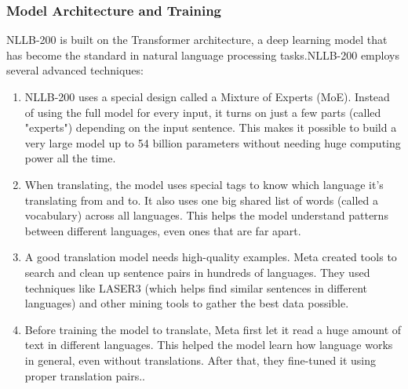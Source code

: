 \documentclass[12pt,oneside,openright,a4paper]{cpe-english-project}
\begin{document}
\subsubsection{Model Architecture and Training}

NLLB-200 is built on the Transformer architecture, a deep learning model that has become the standard in natural language processing tasks.NLLB-200 employs several advanced techniques:

\begin{enumerate}
	\item NLLB-200 uses a special design called a Mixture of Experts (MoE). Instead of using the full model for every input, it turns on just a few parts (called "experts") depending on the input sentence. This makes it possible to build a very large model up to 54 billion parameters without needing huge computing power all the time.
	\item When translating, the model uses special tags to know which language it’s translating from and to. It also uses one big shared list of words (called a vocabulary) across all languages. This helps the model understand patterns between different languages, even ones that are far apart.
	
	\item A good translation model needs high-quality examples. Meta created tools to search and clean up sentence pairs in hundreds of languages. They used techniques like LASER3 (which helps find similar sentences in different languages) and other mining tools to gather the best data possible.
	\item Before training the model to translate, Meta first let it read a huge amount of text in different languages. This helped the model learn how language works in general, even without translations. After that, they fine-tuned it using proper translation pairs..
\end{enumerate}

\newpage
\end{document}
